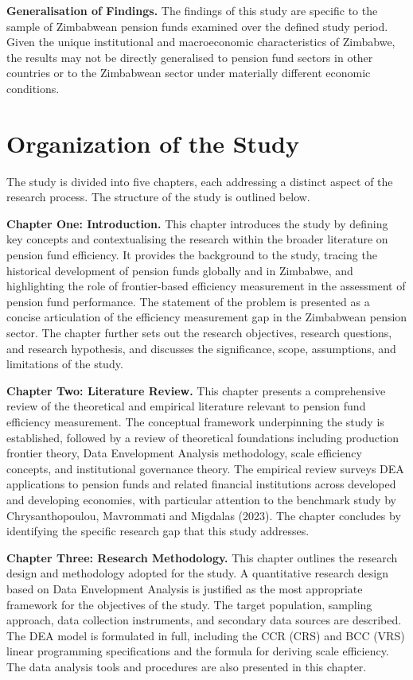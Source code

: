\documentclass[12pt,a4paper]{article}
\begin{document}
\textbf{Generalisation of Findings.} The findings of this study are specific to the sample of Zimbabwean pension funds examined over the defined study period. Given the unique institutional and macroeconomic characteristics of Zimbabwe, the results may not be directly generalised to pension fund sectors in other countries or to the Zimbabwean sector under materially different economic conditions.

\section{Organization of the Study}

The study is divided into five chapters, each addressing a distinct aspect of the research process. The structure of the study is outlined below.

\textbf{Chapter One: Introduction.} This chapter introduces the study by defining key concepts and contextualising the research within the broader literature on pension fund efficiency. It provides the background to the study, tracing the historical development of pension funds globally and in Zimbabwe, and highlighting the role of frontier-based efficiency measurement in the assessment of pension fund performance. The statement of the problem is presented as a concise articulation of the efficiency measurement gap in the Zimbabwean pension sector. The chapter further sets out the research objectives, research questions, and research hypothesis, and discusses the significance, scope, assumptions, and limitations of the study.

\textbf{Chapter Two: Literature Review.} This chapter presents a comprehensive review of the theoretical and empirical literature relevant to pension fund efficiency measurement. The conceptual framework underpinning the study is established, followed by a review of theoretical foundations including production frontier theory, Data Envelopment Analysis methodology, scale efficiency concepts, and institutional governance theory. The empirical review surveys DEA applications to pension funds and related financial institutions across developed and developing economies, with particular attention to the benchmark study by Chrysanthopoulou, Mavrommati and Migdalas (2023). The chapter concludes by identifying the specific research gap that this study addresses.

\textbf{Chapter Three: Research Methodology.} This chapter outlines the research design and methodology adopted for the study. A quantitative research design based on Data Envelopment Analysis is justified as the most appropriate framework for the objectives of the study. The target population, sampling approach, data collection instruments, and secondary data sources are described. The DEA model is formulated in full, including the CCR (CRS) and BCC (VRS) linear programming specifications and the formula for deriving scale efficiency. The data analysis tools and procedures are also presented in this chapter.
\end{document}
